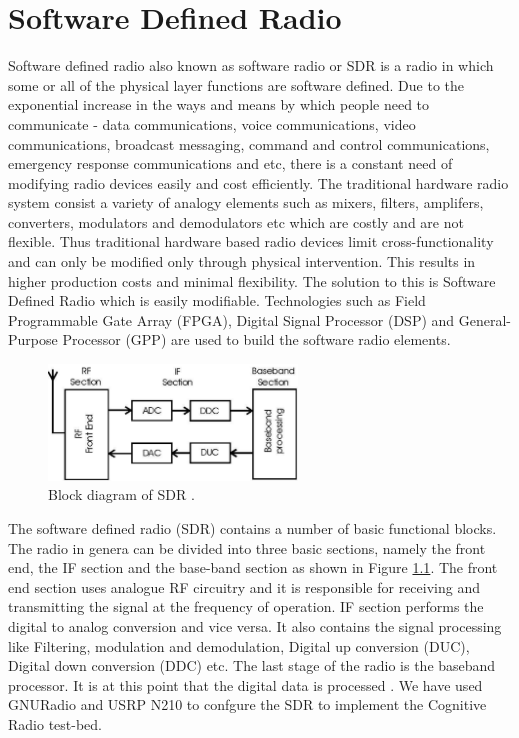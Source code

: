 \chapter{Software Defined Radio}
Software defined radio also known as software radio or SDR is a radio in which
some or all of the physical layer functions are software defined. Due to the  
exponential increase in the ways and means by which people need to communicate
- data communications, voice communications, video communications, broadcast 
messaging, command and control communications, emergency response 
communications and etc, there is a constant need of modifying radio devices 
easily and cost efficiently. The traditional hardware radio system consist a 
variety of analogy elements such as mixers, filters, amplifers, converters, 
modulators and demodulators etc which are costly and are not flexible. Thus 
traditional hardware based radio devices limit cross-functionality and can 
only be modified only through physical intervention. This results in higher 
production costs and minimal flexibility. The solution to this is Software 
Defined Radio which is easily modifiable. Technologies such as Field 
Programmable Gate Array (FPGA), Digital Signal Processor (DSP) and 
General-Purpose Processor (GPP) are used to build the software radio elements.


\begin{figure}
\centering
\includegraphics[width=0.59\textwidth]{../images/sdrBlock}
\caption[Block diagram of SDR]{Block diagram of SDR \protect\cite{kranthi13}.}
\label{sdrBlock}
\end{figure}

The software defined radio (SDR) contains a number of basic functional blocks.
The radio in genera can be divided into three basic sections, namely the front
end, the IF section and the base-band section as shown in Figure \ref{sdrBlock}. The 
front end section uses analogue RF circuitry and it is responsible for 
receiving and transmitting the signal at the frequency of operation. IF 
section performs the digital to analog conversion and vice versa. It also 
contains the signal processing like Filtering, modulation and demodulation, 
Digital up conversion (DUC), Digital down conversion (DDC) etc. The last stage
of the radio is the baseband processor. It is at this point that the digital 
data is processed \cite{miller08}\cite{kranthi13}.
We have used GNURadio and USRP N210 to confgure the SDR to implement the
Cognitive Radio test-bed. 

